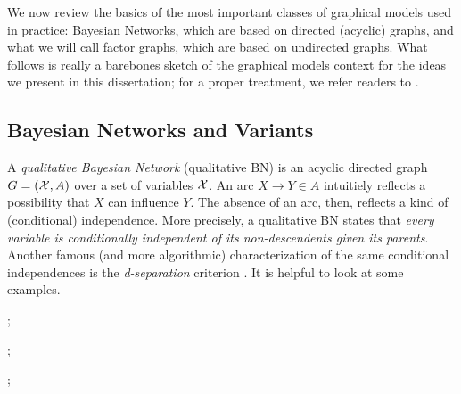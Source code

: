 We now review the basics of the most important classes of graphical models used in practice:
Bayesian Networks, which are based on directed (acyclic) graphs, and
what we will call factor graphs, which are based on undirected graphs. 
What follows is really a barebones sketch of the graphical models context for the ideas we present in this dissertation; for a proper treatment, we refer readers to 
    \citet{koller2009probabilistic}.
    
\subsection{Bayesian Networks and Variants}

A \emph{qualitative Bayesian Network} (qualitative BN) is an acyclic directed graph $G = (\mathcal X, A)$ over a set of variables $\mathcal X$. 
An arc $X {\to} Y \in A$ intuitiely reflects a possibility that $X$ can influence $Y$. 
The absence of an arc, then, reflects a kind of (conditional) independence. 
More precisely, a qualitative BN states that
\textit{every variable is conditionally independent of its non-descendents given its parents}.
Another famous (and more algorithmic) characterization of the same conditional independences is the \emph{d-separation} criterion  \cite{geiger-pearl-d-separation}. 
It is helpful to look at some examples.

\begin{center}
    ;~~~
    ;~~~
    ;~~~
\end{center}

